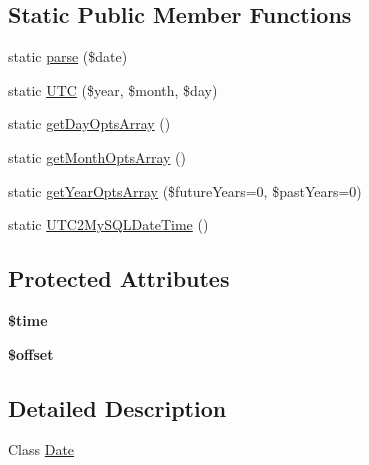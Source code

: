 \subsection*{Static Public Member Functions}
\begin{DoxyCompactItemize}
\item 
static \hyperlink{class_date_ace4d1e8e89854ae12530593a9921f78f}{parse} (\$date)
\item 
static \hyperlink{class_date_a8c9949dad29c21d071042c10f3af65ec}{U\-T\-C} (\$year, \$month, \$day)
\item 
static \hyperlink{class_date_ac52333e39fa3d076ca9ce79dae6441cf}{get\-Day\-Opts\-Array} ()
\item 
static \hyperlink{class_date_a8559cb4f50c8ba5c957cf2e32360afd6}{get\-Month\-Opts\-Array} ()
\item 
static \hyperlink{class_date_a51cd8356727b4ddb5edf219763cf56e8}{get\-Year\-Opts\-Array} (\$future\-Years=0, \$past\-Years=0)
\item 
static \hyperlink{class_date_a70f1ee8934dee50820a83949e3074e9f}{U\-T\-C2\-My\-S\-Q\-L\-Date\-Time} ()
\end{DoxyCompactItemize}
\subsection*{Protected Attributes}
\begin{DoxyCompactItemize}
\item 
\hypertarget{class_date_a78db1a0602e3b6ac1d9a1b5ec103c160}{{\bfseries \$time}}\label{class_date_a78db1a0602e3b6ac1d9a1b5ec103c160}

\item 
\hypertarget{class_date_aec4de82415d7f05cb9748d12d3a95a87}{{\bfseries \$offset}}\label{class_date_aec4de82415d7f05cb9748d12d3a95a87}

\end{DoxyCompactItemize}


\subsection{Detailed Description}
Class \hyperlink{class_date}{Date} 


